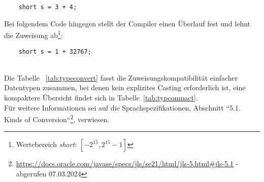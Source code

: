 \begin{verbatim}
    short s = 3 + 4;
\end{verbatim}

Bei folgendem Code hingegen stellt der Compiler einen Überlauf fest und lehnt die Zuweisung ab\footnote{Wertebereich \textit{short}: $[-2^{15}, 2^{15} -1]$}:

\begin{verbatim}
    short s = 1 + 32767;
\end{verbatim}\\

\noindent
Die Tabelle ~\ref{tab:typeconvert} fasst die Zuweisungskompatibilität einfacher Datentypen zusammen, bei denen kein explizites Casting erforderlich ist, eine kompaktere Übersicht findet sich in Tabelle~\ref{tab:typcompact}.\\
Für weitere Informationen sei auf die Sprachspezifikationen, Abschnitt ``5.1. Kinds of Conversion``\footnote{
    \url{https://docs.oracle.com/javase/specs/jls/se21/html/jls-5.html#jls-5.1} - abgerufen 07.03.2024
}, verwiesen.


